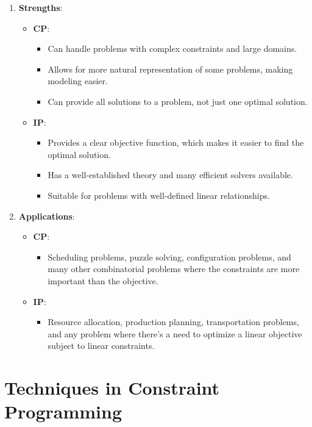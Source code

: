 \begin{enumerate}[label=\textbf{\arabic*.}]
    \item \textbf{Strengths}:
    \begin{itemize}
        \item \textbf{CP}:
        \begin{itemize}
            \item Can handle problems with complex constraints and large domains.
            \item Allows for more natural representation of some problems, making modeling easier.
            \item Can provide all solutions to a problem, not just one optimal solution.
        \end{itemize}
        \item \textbf{IP}:
        \begin{itemize}
            \item Provides a clear objective function, which makes it easier to find the optimal solution.
            \item Has a well-established theory and many efficient solvers available.
            \item Suitable for problems with well-defined linear relationships.
        \end{itemize}
    \end{itemize}
    
    \item \textbf{Applications}:
    \begin{itemize}
        \item \textbf{CP}:
        \begin{itemize}
            \item Scheduling problems, puzzle solving, configuration problems, and many other combinatorial problems where the constraints are more important than the objective.
        \end{itemize}
        \item \textbf{IP}:
        \begin{itemize}
            \item Resource allocation, production planning, transportation problems, and any problem where there's a need to optimize a linear objective subject to linear constraints.
        \end{itemize}
    \end{itemize}
    
    \end{enumerate}
    
    \section{Techniques in Constraint Programming}

